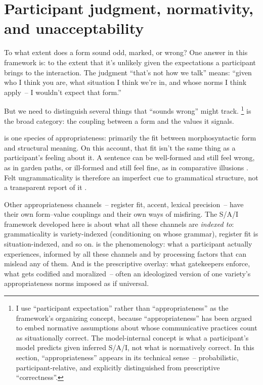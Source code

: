 \documentclass[11pt,letterpaper]{article}
\begin{document}
\section{Participant judgment, normativity, and unacceptability}

To what extent does a form sound odd, marked, or wrong? One answer in this framework is: to the extent that it's unlikely given the expectations a participant brings to the interaction. The judgment \enquote{that's not how we talk} means: \enquote{given who I think you are, what situation I think we're in, and whose norms I think apply~-- I wouldn't expect that form.}

But we need to distinguish several things that \enquote{sounds wrong} might track. \footnote{I use \enquote{participant expectation} rather than \enquote{appropriateness} as the framework's organizing concept, because \enquote{appropriateness} has been argued to embed normative assumptions about whose communicative practices count as situationally correct. The model-internal concept is what a participant's model predicts given inferred S/A/I, not what is normatively correct. In this section, \enquote{appropriateness} appears in its technical sense~-- probabilistic, participant-relative, and explicitly distinguished from prescriptive \enquote{correctness}.} is the broad category: the coupling between a form and the values it signals.

 is one species of appropriateness: primarily the fit between morphosyntactic form and structural meaning. On this account, that fit isn't the same thing as a participant's feeling about it. A sentence can be well-formed and still feel wrong, as in garden paths, or ill-formed and still feel fine, as in comparative illusions \citep{Wellwood2018}. Felt ungrammaticality is therefore an imperfect cue to grammatical structure, not a transparent report of it \citep{reynolds2024grammaticality}.

Other appropriateness channels~-- register fit, accent, lexical precision~-- have their own form--value couplings and their own ways of misfiring. The S/A/I framework developed here is about what all these channels are \emph{indexed to}: grammaticality is variety-indexed (conditioning on whose grammar), register fit is situation-indexed, and so on.  is the phenomenology: what a participant actually experiences, informed by all these channels and by processing factors that can mislead any of them. And  is the prescriptive overlay: what gatekeepers enforce, what gets codified and moralized~-- often an ideologized version of one variety's appropriateness norms imposed as if universal.
\end{document}
